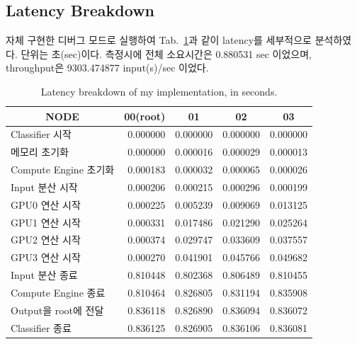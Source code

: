 \subsection{Latency Breakdown}

자체 구현한 디버그 모드로 실행하여 Tab.~\ref{tab:latency_breakdown}과 같이 
latency를 세부적으로 분석하였다. 단위는 초(sec)이다.
측정시에 전체 소요시간은 0.880531 sec 이었으며, throughput은 9303.474877 input(s)/sec 이었다.

\begin{table}[]
    \centering
    \begin{tabular}{l|rrrr}
    \multicolumn{1}{c|}{NODE} & \multicolumn{1}{c}{00(root)} & \multicolumn{1}{c}{01} & \multicolumn{1}{c}{02} & \multicolumn{1}{c}{03} \\ \hline
    Classifier 시작           & 0.000000               & 0.000000               & 0.000000               & 0.000000               \\
    메모리 초기화              & 0.000000               & 0.000016               & 0.000029               & 0.000013               \\
    Compute Engine 초기화     & 0.000183               & 0.000032               & 0.000065               & 0.000026               \\
    Input 분산 시작            & 0.000206               & 0.000215               & 0.000296               & 0.000199               \\
    GPU0 연산 시작             & 0.000225               & 0.005239               & 0.009069               & 0.013125               \\
    GPU1 연산 시작             & 0.000331               & 0.017486               & 0.021290               & 0.025264               \\
    GPU2 연산 시작             & 0.000374               & 0.029747               & 0.033609               & 0.037557               \\
    GPU3 연산 시작             & 0.000270               & 0.041901               & 0.045766               & 0.049682               \\
    Input 분산 종료            & 0.810448               & 0.802368               & 0.806489               & 0.810455               \\
    Compute Engine 종료       & 0.810464               & 0.826805               & 0.831194               & 0.835908               \\
    Output을 root에 전달       & 0.836118               & 0.826890               & 0.836094               & 0.836072               \\
    Classifier 종료           & 0.836125               & 0.826905               & 0.836106               & 0.836081              
    \end{tabular}
    \caption{Latency breakdown of my implementation, in seconds.}
    \label{tab:latency_breakdown}
\end{table}

